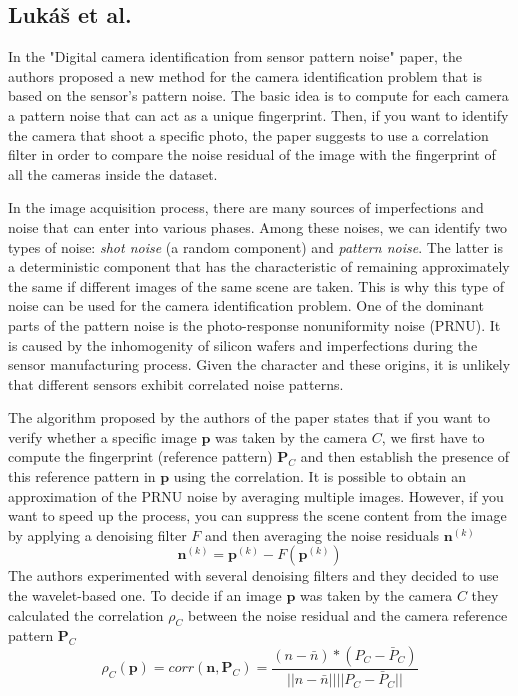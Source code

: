 \subsection{Lukáš et al.}
In the "Digital camera identification from sensor pattern noise" paper, the authors proposed a new method for the camera identification problem that is based on the sensor's pattern noise. 
The basic idea is to compute for each camera a pattern noise that can act as a unique fingerprint. Then, if you want to identify the camera that shoot a specific photo, the paper suggests to use a correlation filter in order to compare the noise residual of the image with the fingerprint of all the cameras inside the dataset.

In the image acquisition process, there are many sources of imperfections and noise that can enter into various phases. Among these noises, we can identify two types of noise: \textit{shot noise} (a random component) and \textit{pattern noise}. The latter is a deterministic component that has the characteristic of remaining approximately the same if different images of the same scene are taken. This is why this type of noise can be used for the camera identification problem. One of the dominant parts of the pattern noise is the photo-response nonuniformity noise (PRNU). It is caused by the inhomogenity of silicon wafers and imperfections during the sensor manufacturing process. Given the character and these origins, it is unlikely that different sensors exhibit correlated noise patterns.

The algorithm proposed by the authors of the paper states that if you want to verify whether a specific image $\boldsymbol{p}$ was taken by the camera $C$, we first have to compute the fingerprint (reference pattern) $\boldsymbol{P}_C$ and then establish the presence of this reference pattern in $\boldsymbol{p}$ using the correlation. It is possible to obtain an approximation of the PRNU noise by averaging multiple images. However, if you want to speed up the process, you can suppress the scene content from the image by applying a denoising filter $F$ and then averaging the noise residuals $\boldsymbol{n}^{(k)}$
	\[ \boldsymbol{n}^{(k)} = \boldsymbol{p}^{(k)} -  F(\boldsymbol{p}^{(k)})\]
The authors experimented with several denoising filters and they decided to use the wavelet-based one. 
To decide if an image $\boldsymbol{p}$ was taken by the camera $C$ they calculated the correlation $\rho_C$ between the noise residual and the camera reference pattern $\boldsymbol{P}_C$
\[ \rho_C(\boldsymbol{p}) = corr(\boldsymbol{n}, \boldsymbol{P}_C) = \frac{(n-\bar{n})*(P_C - \bar{P}_C)}{||n-\bar{n}||||P_C-\bar{P}_C||}	\]
